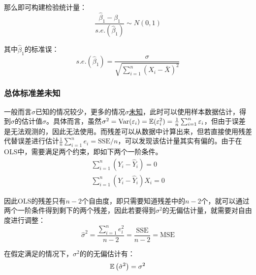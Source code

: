 \documentclass[11pt]{article}
\begin{document}
那么即可构建检验统计量：
\begin{equation*}
    \frac{\hat{\beta}_1 - \beta_1}{s.e.(\hat{\beta}_1)} \sim N(0,1)
\end{equation*}

其中$\hat{\beta}_1$的标准误：
\begin{equation*}
    s.e.(\hat{\beta}_1) = \frac{\sigma}{\sqrt{\sum_{i=1}^{n} \left(X_i - \bar{X}\right)^2}}
\end{equation*}

\subsubsection*{总体标准差未知}

一般而言$\sigma$已知的情况较少，更多的情况$\sigma$\uline{未知}，此时可以使用样本数据估计，得到$\sigma$的估计值$\hat{\sigma}$。具体而言，虽然$\sigma^2 = \operatorname{Var}(\varepsilon_i) = \mathbb{E}(\varepsilon_i^2) = \frac{1}{n} \sum_{i=1}^{n} \varepsilon_i$，但由于误差是无法观测的，因此无法使用。而残差可以从数据中计算出来，但若直接使用残差代替误差进行估计$\frac{1}{n} \sum_{i=1}^{n} e_i = \text{SSE}/n$，可以发现该估计量其实有偏的。由于在OLS中，需要满足两个约束，即如下两个一阶条件。
\begin{gather*}
    \sum_{i=1}^{n} \left( Y_i - \hat{Y}_i \right) = 0 \\
    \sum_{i=1}^{n} \left( Y_i - \hat{Y}_i \right) X_i = 0
\end{gather*}

因此OLS的残差只有$n-2$个自由度，即只需要知道残差中的$n-2$个，就可以通过两个一阶条件得到剩下的两个残差，因此若要得到$\sigma^2$的无偏估计量，就需要对自由度进行调整：
\begin{equation*}
    \hat{\sigma}^2 = \frac{\sum_{i=1}^{n} e_i^2}{n-2} = \frac{\text{SSE}}{n-2} = \text{MSE}
\end{equation*}

在假定满足的情况下，$\sigma^2$的的无偏估计有：
\begin{equation*}
    \mathbb{E}\left( \hat{\sigma}^2 \right) = \sigma^2
\end{equation*}
\end{document}
